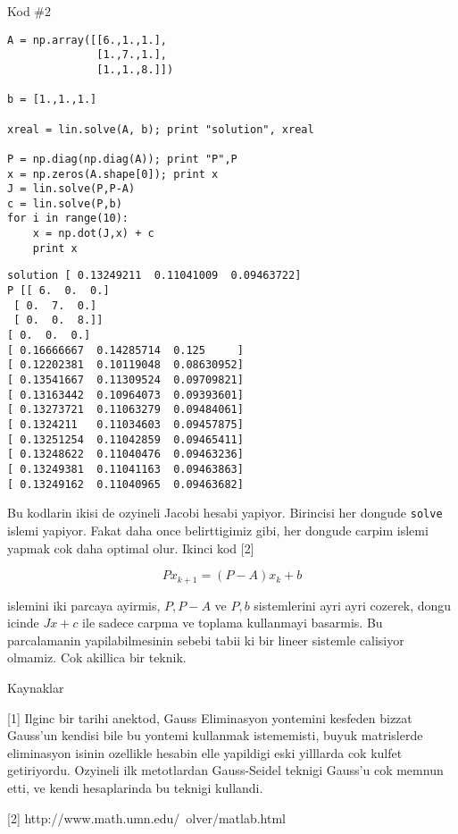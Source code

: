 \documentclass[12pt,fleqn]{article}\usepackage{../common}
\begin{document}
Kod \#2

\begin{verbatim}
A = np.array([[6.,1.,1.],
              [1.,7.,1.],
              [1.,1.,8.]])

b = [1.,1.,1.]

xreal = lin.solve(A, b); print "solution", xreal

P = np.diag(np.diag(A)); print "P",P
x = np.zeros(A.shape[0]); print x
J = lin.solve(P,P-A)
c = lin.solve(P,b)
for i in range(10):
    x = np.dot(J,x) + c
    print x
\end{verbatim}

\begin{verbatim}
solution [ 0.13249211  0.11041009  0.09463722]
P [[ 6.  0.  0.]
 [ 0.  7.  0.]
 [ 0.  0.  8.]]
[ 0.  0.  0.]
[ 0.16666667  0.14285714  0.125     ]
[ 0.12202381  0.10119048  0.08630952]
[ 0.13541667  0.11309524  0.09709821]
[ 0.13163442  0.10964073  0.09393601]
[ 0.13273721  0.11063279  0.09484061]
[ 0.1324211   0.11034603  0.09457875]
[ 0.13251254  0.11042859  0.09465411]
[ 0.13248622  0.11040476  0.09463236]
[ 0.13249381  0.11041163  0.09463863]
[ 0.13249162  0.11040965  0.09463682]
\end{verbatim}

Bu kodlarin ikisi de ozyineli Jacobi hesabi yapiyor. Birincisi her dongude 
\verb!solve! islemi yapiyor. Fakat daha once belirttigimiz gibi, her
dongude carpim islemi yapmak cok daha optimal olur. Ikinci kod [2]

\[ Px_{k+1} =  (P - A)x_k + b \]

islemini iki parcaya ayirmis, $P,P-A$ ve $P,b$ sistemlerini ayri ayri
cozerek, dongu icinde $Jx + c$ ile sadece carpma ve toplama kullanmayi
basarmis. Bu parcalamanin yapilabilmesinin sebebi tabii ki bir lineer
sistemle calisiyor olmamiz. Cok akillica bir teknik. 

Kaynaklar

[1] Ilginc bir tarihi anektod, Gauss Eliminasyon yontemini kesfeden bizzat
Gauss'un kendisi bile bu yontemi kullanmak istememisti, buyuk matrislerde
eliminasyon isinin ozellikle hesabin elle yapildigi eski yilllarda cok
kulfet getiriyordu. Ozyineli ilk metotlardan Gauss-Seidel teknigi Gauss'u
cok memnun etti, ve kendi hesaplarinda bu teknigi kullandi.

[2] http://www.math.umn.edu/~olver/matlab.html
\end{document}
